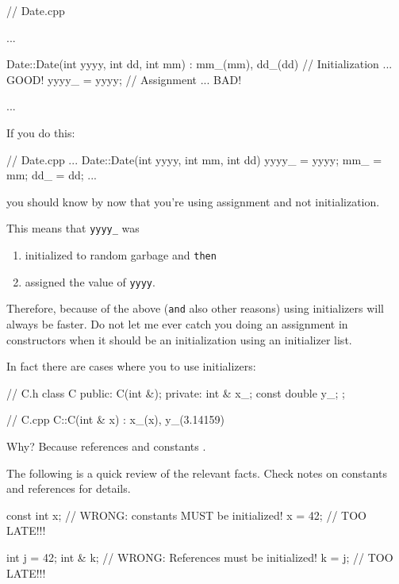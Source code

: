 \begin{consolethree}[escapeinside=||]
// Date.cpp

...

Date::Date(int yyyy, int dd, int mm)
    : mm_(mm), dd_(dd) // Initialization ... GOOD!
{
    yyyy_ = yyyy;          // Assignment ... BAD!
}

...
\end{consolethree}

 If you do this:

\begin{consolethree}[escapeinside=||]
// Date.cpp
...
Date::Date(int yyyy, int mm, int dd)
{
    yyyy_ = yyyy;
    mm_ = mm;
    dd_ = dd;
}
...
\end{consolethree}

you should know by now that you're using assignment and not
initialization.

This means that \texttt{yyyy\_} was

\begin{enumerate}
\item initialized to random garbage and \texttt{then}
\item assigned the value of \texttt{yyyy}.
\end{enumerate}

Therefore, because of the above (\texttt{and} also other reasons) using
initializers will always be faster. Do not let me ever catch you doing
an assignment in constructors when it should be an initialization using
an initializer list.

In fact there are cases where you  to use initializers:

\begin{consolethree}[escapeinside=||]
// C.h
class C
{
public:
    C(int &);
private:
    int & x_;
    const double y_;
};
\end{consolethree}

\begin{consolethree}[escapeinside=||]
// C.cpp
C::C(int & x)
    : x_(x), y_(3.14159)
{}
\end{consolethree}

Why? Because references and constants .

The following is a quick review of the relevant facts. Check notes on
constants and references for details.

\begin{consolethree}[escapeinside=||]
const int x; // WRONG: constants MUST be initialized!
x = 42;      // TOO LATE!!!

int j = 42;
int & k;     // WRONG: References must be initialized!
k = j;       // TOO LATE!!!
\end{consolethree}

